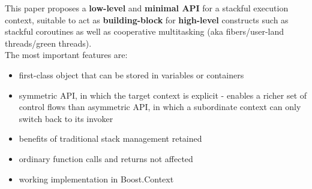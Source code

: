 This paper proposes a {\bfseries low-level} and {\bfseries minimal API} for a
stackful execution context, suitable to act as {\bfseries building-block} for
{\bfseries high-level} constructs such as stackful coroutines as well as
cooperative multitasking (aka fibers/user-land threads/green threads).\\
\newline
The most important features are:
\begin{itemize}
    \item first-class object that can be stored in variables or containers
    \item symmetric API, in which the target context is explicit - enables a
          richer set of control flows than asymmetric API, in which a
          subordinate context can only switch back to its invoker
    \item benefits of traditional stack management retained
    \item ordinary function calls and returns not affected
    \item working implementation in Boost.Context\cite{bcontext}
\end{itemize}
